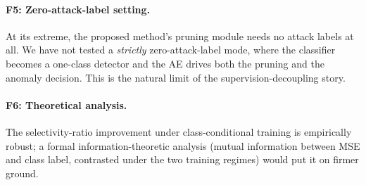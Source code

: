 \documentclass[11pt,a4paper]{report}
\theoremstyle{definition}
\theoremstyle{remark}
\begin{document}
\paragraph{F5: Zero-attack-label setting.}
At its extreme, the proposed method's pruning module needs no attack
labels at all. We have not tested a \emph{strictly} zero-attack-label
mode, where the classifier becomes a one-class detector and the AE
drives both the pruning and the anomaly decision. This is the natural
limit of the supervision-decoupling story.

\paragraph{F6: Theoretical analysis.}
The selectivity-ratio improvement under class-conditional training is
empirically robust; a formal information-theoretic analysis (mutual
information between MSE and class label, contrasted under the two
training regimes) would put it on firmer ground.



\end{document}
